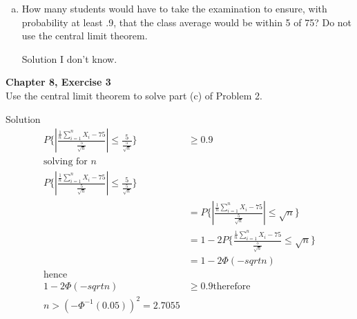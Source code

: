 \documentclass{article}
\begin{document}
\begin{spacing}{1.1}
\begin{homeworkProblem}
\begin{enumerate}[(a)]
\begin{homeworkSection}{Solution}
\begin{align*}
          k &= 2\\
          P\{ |X - 75| \ge (2)(5)\} &\le \frac{ 1}{ 4}\\
          &= 0.25\\
          \text{Therefore}\\
          P\{ |X - 75| \le 10\} &= 1 - P\{ |X - 75| \ge 10\}\\
          &= 1 - 0.25\\
          &= 0.75\\
        \end{align*}
      \end{homeworkSection}
    \item How many students would have to take the examination to 
    ensure, with probability at least .9, that the class average 
    would be within 5 of 75? Do not use the central limit theorem.
      \begin{homeworkSection}{Solution}
        I don't know.
      \end{homeworkSection}
  \end{enumerate}
\end{homeworkProblem}
  

\newpage
\begin{homeworkProblem}
  {\bf Chapter 8, Exercise 3}\\
  Use the central limit theorem to solve part (c) of Problem 2.
  \begin{homeworkSection}{Solution}
     \begin{align*}
        P\{ \left|\frac{ \frac{ 1}{ n}\sum\limits_{i = 1}^{n} X_i - 75}{ \frac{ 5}{ \sqrt{ n}}}\right| \le \frac{ 5}{ \frac{ 5}{ \sqrt{ n}}}\} &\ge 0.9\\
        \text{solving for $n$}\\
        P\{ \left|\frac{ \frac{ 1}{ n}\sum\limits_{i = 1}^{n} X_i - 75}{ \frac{ 5}{ \sqrt{ n}}}\right| \le \frac{ 5}{ \frac{ 5}{ \sqrt{ n}}}\}\\
        &= P\{ \left|\frac{ \frac{ 1}{ n}\sum\limits_{i = 1}^{n} X_i - 75}{ \frac{ 5}{ \sqrt{ n}}}\right| \le \sqrt{ n}\}\\
        &= 1 - 2P\{ \frac{ \frac{ 1}{ n}\sum\limits_{i = 1}^{n} X_i - 75}{ \frac{ 5}{ \sqrt{ n}}} \le \sqrt{ n}\}\\
        &= 1 - 2 \Phi(-sqrt{n})\\
        \text{hence}\\
        1 - 2 \Phi(-sqrt{n}) &\ge 0.9
        \text{therefore}\\
        n > (-\Phi^{-1}(0.05))^2 = 2.7055
      \end{align*}
  \end{homeworkSection}
\end{homeworkProblem}


\end{spacing}
\end{document}
